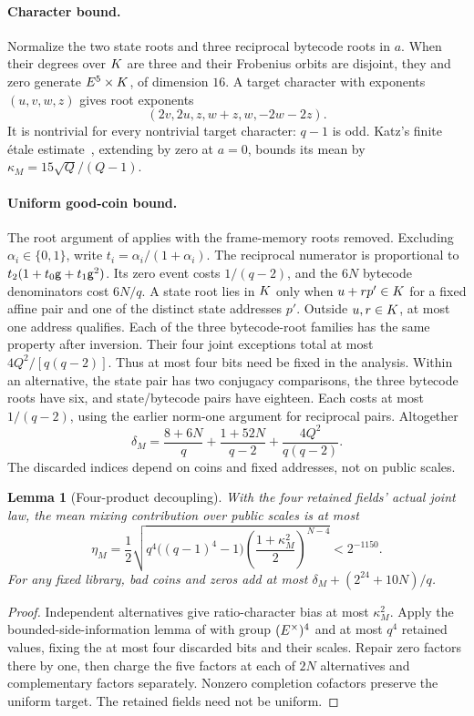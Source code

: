 \documentclass[11pt]{article}
\newtheorem{lemma}{Lemma}
\begin{document}
\paragraph{Character bound.} Normalize the two state roots and three reciprocal bytecode roots in $a$. When their degrees over $K$ are three and their Frobenius orbits are disjoint, they and zero generate $E^5\times K$, of dimension $16$. A target character with exponents $(u,v,w,z)$ gives root exponents
\[
 (2v,2u,z,w+z,w,-2w-2z).
\]
It is nontrivial for every nontrivial target character: $q-1$ is odd. Katz's finite \'etale estimate~\cite{katz}, extending by zero at $a=0$, bounds its mean by $\kappa_M=15\sqrt Q/(Q-1)$.

\paragraph{Uniform good-coin bound.} The root argument of  applies with the frame-memory roots removed. Excluding $\alpha_i\in\{0,1\}$, write $t_i=\alpha_i/(1+\alpha_i)$. The reciprocal numerator is proportional to $t_2(1+t_0\mathsf{g}+t_1\mathsf{g}^2)$. Its zero event costs $1/(q-2)$, and the $6N$ bytecode denominators cost $6N/q$. A state root lies in $K$ only when $u+rp'\in K$ for a fixed affine pair and one of the distinct state addresses $p'$. Outside $u,r\in K$, at most one address qualifies. Each of the three bytecode-root families has the same property after inversion. Their four joint exceptions total at most $4Q^2/[q(q-2)]$. Thus at most four bits need be fixed in the analysis. Within an alternative, the state pair has two conjugacy comparisons, the three bytecode roots have six, and state/bytecode pairs have eighteen. Each costs at most $1/(q-2)$, using the earlier norm-one argument for reciprocal pairs. Altogether
\[
 \delta_M=\frac{8+6N}{q}+\frac{1+52N}{q-2}
                +\frac{4Q^2}{q(q-2)}.
\]
The discarded indices depend on coins and fixed addresses, not on public scales.

\begin{lemma}[Four-product decoupling]
With the four retained fields' actual joint law, the mean mixing contribution over public scales is at most
\[
 \eta_M=\frac12\sqrt{q^4\bigl((q-1)^4-1\bigr)
       \left(\frac{1+\kappa_M^2}{2}\right)^{N-4}}<2^{-1150}.
\]
For any fixed library, bad coins and zeros add at most $\delta_M+(2^{24}+10N)/q$.
\end{lemma}
\begin{proof}
Independent alternatives give ratio-character bias at most $\kappa_M^2$. Apply the bounded-side-information lemma of  with group $(E^\times)^4$ and at most $q^4$ retained values, fixing the at most four discarded bits and their scales. Repair zero factors there by one, then charge the five factors at each of $2N$ alternatives and complementary factors separately. Nonzero completion cofactors preserve the uniform target. The retained fields need not be uniform.
\end{proof}
\end{document}
